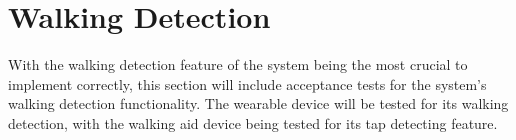        \vspace{1em}
        

        \vspace{4em}
        

        \vspace{4em}
        

        \vspace{4em}
        

        \vspace{4em}
        

        \vspace{4em}
        

        \vspace{4em}
        

        \vspace{4em}
        

        \vspace{4em}
        

    \section{Walking Detection}
    \label{sec:test_walking_detection}

        With the walking detection feature of the system being the most crucial to implement correctly, this section will include acceptance tests for the system's walking detection functionality. The wearable device will be tested for its walking detection, with the walking aid device being tested for its tap detecting feature.

        \vspace{1em}
        

        \vspace{4em}
        

        \vspace{4em}
        

